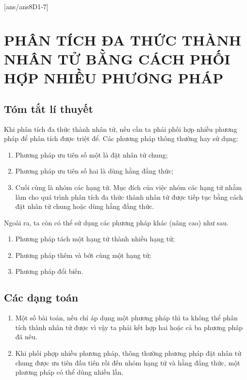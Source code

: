 [ans/ans8D1-7]
\section{PHÂN TÍCH ĐA THỨC THÀNH NHÂN TỬ BẰNG CÁCH PHỐI HỢP NHIỀU PHƯƠNG PHÁP}

\subsection{Tóm tắt lí thuyết}
Khi phân tích đa thức thành nhân tử, nếu cần ta phải phối hợp nhiều phương pháp để phân tích được triệt để. Các phương pháp thông thường hay sử dụng:
\begin{enumerate}[\tickEX]
\item Phương pháp ưu tiên số một là đặt nhân tử chung;
\item Phương pháp ưu tiên số hai là dùng hằng đẳng thức;
\item Cuối cùng là nhóm các hạng tử. Mục đích của việc nhóm các hạng tử nhằm làm cho quá trình phân tích đa thức thành nhân tử được tiếp tục bằng cách đặt nhân tử chung hoặc dùng hằng đẳng thức.
\end{enumerate}
Ngoài ra, ta còn có thể sử dụng các phương pháp khác (nâng cao) như sau.
\begin{enumerate}[\tickEX]
\item Phương pháp tách một hạng tử thành nhiều hạng tử;
\item Phương pháp thêm và bớt cùng một hạng tử;
\item Phương pháp đổi biến.
\end{enumerate}

\subsection{Các dạng toán}
\begin{dang}
\begin{enumerate}[\tickEX]
\item Một số bài toán, nếu chỉ áp dụng một phương pháp thì ta không thể phân tích thành nhân tử được vì vậy ta phải kết hợp hai hoặc cả ba phương pháp đã nêu.
\item Khi phối phợp nhiều phương pháp, thông thường phương pháp đặt nhân tử chung được ưu tiên đầu tiên rồi đến nhóm hạng tử và hằng đẳng thức, một phương pháp có thể dùng nhiều lần.
\end{enumerate}
\end{dang}

